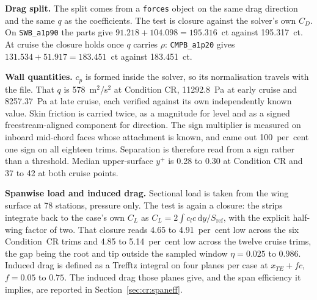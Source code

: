 \textbf{Drag split.} The split comes from a \texttt{forces} object on the same drag direction and
the same $q$ as the coefficients. The test is closure against the solver's own $C_D$. On
\texttt{SWB\_a1p90} the parts give $91.218 + 104.098 = 195.316$~ct against 195.317~ct. At cruise
the closure holds once $q$ carries $\rho$: \texttt{CMPB\_a1p20} gives
$131.534 + 51.917 = 183.451$~ct against 183.451~ct.

\textbf{Wall quantities.} $c_p$ is formed inside the solver, so its normalisation travels with the
file. That $q$ is 578~m$^2$/s$^2$ at Condition CR, 11292.8~Pa at early cruise and 8257.37~Pa at late
cruise, each verified
against its own independently known value. Skin friction is carried twice, as a magnitude for
level and as a signed freestream-aligned component for direction. The sign multiplier is measured
on inboard mid-chord faces whose attachment is known, and came out 100~per~cent one sign on all
eighteen trims. Separation is therefore read from a sign rather than a threshold. Median
upper-surface $y^+$ is 0.28 to 0.30 at Condition CR and 37 to 42 at both cruise points.

\textbf{Spanwise load and induced drag.} Sectional load is taken from the wing surface at 78
stations, pressure only. The test is again a closure: the strips integrate back to the case's own
$C_L$ as $C_L = 2\int c_l c\,\mathrm{d}y/S_\mathrm{ref}$, with the explicit half-wing factor of
two. That closure reads 4.65 to 4.91~per~cent low across the six Condition~CR trims and 4.85 to
5.14~per~cent low across the twelve cruise trims, the gap being the root and tip outside the sampled window $\eta = 0.025$ to $0.986$. Induced drag is
defined as a Trefftz integral on four planes per case at $x_{TE} + fc$, $f = 0.05$ to $0.75$. The
induced drag those planes give, and the span efficiency it implies, are reported in
Section~\ref{sec:cr:spaneff}.

